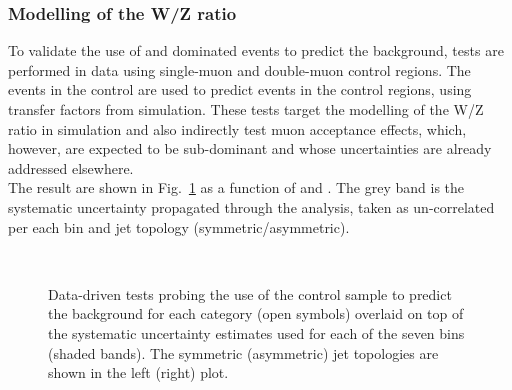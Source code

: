 \subsubsection*{Modelling of the W/Z ratio}
\label{sec:tfSyst_WZratio}
To validate the use of \wmj and \ttbar dominated \mj events to predict the \znunu
background, tests are performed in data using single-muon and double-muon control regions. 
The events in the \mj control are used to predict events in the \mmj control regions, 
using transfer factors from simulation. 
These tests target the modelling of the W/Z ratio in simulation and 
also indirectly test muon acceptance effects, which, however, 
are expected to be sub-dominant and whose uncertainties are already addressed elsewhere. \\
The result are shown in Fig.~\ref{fig:closureMuToMuMu} as a function of \scalht and \njet. 
The grey band is the systematic uncertainty propagated through the analysis, 
taken as un-correlated per each \scalht bin and jet topology (symmetric/asymmetric).


\begin{figure}[h!]
  \begin{center}
    ~~
    \caption{Data-driven tests probing the use of the \mj control sample
      to predict the \znunu background for each
      \njet category (open symbols) overlaid on top of the systematic
      uncertainty estimates used for each of the seven \scalht bins (shaded bands).  
      The symmetric (asymmetric) jet topologies are shown in the left (right) plot. 
    }
    \label{fig:closureMuToMuMu}
  \end{center} 
\end{figure}




